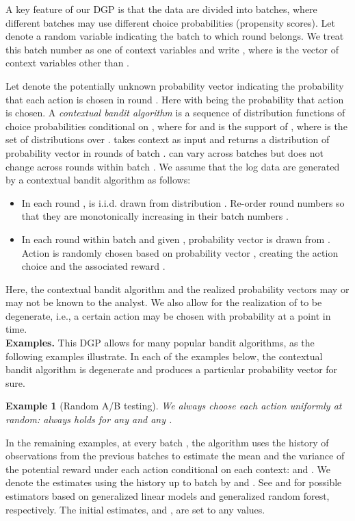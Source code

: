 \documentclass[letterpaper]{article} \usepackage{aaai19}  \usepackage{times}  \usepackage{helvet}  \usepackage{courier}  \usepackage{url}  \usepackage{graphicx}  \frenchspacing  \usepackage{comment}
\newtheorem{example}{Example}
\newcommand{\citet}[1]
{\citeauthor{#1} \shortcite{#1}}
\begin{document}
A key feature of our DGP is that the data  are divided into  batches, where different batches may use different choice probabilities (propensity scores). 
Let  denote a random variable indicating the batch to which round  belongs.
We treat this batch number as one of context variables and write , where  is the vector of context variables other than . 


Let  denote the potentially unknown probability vector indicating the probability that each action is chosen in round . 
Here  with  being the probability that action  is chosen. 
A {\it contextual bandit algorithm} is a sequence  of distribution functions of choice probabilities  conditional on , where  for  and  is the support of , where  is the set of distributions over .
 takes context  as input and returns a distribution of probability vector  in rounds of batch .
 can vary across batches but does not change across rounds within batch . 
We assume that the log data are generated by a contextual bandit algorithm  as follows:

\begin{itemize}
\item In each round ,  is i.i.d. drawn from distribution . 
Re-order round numbers so that they are monotonically increasing in their batch numbers . 
\item In each round  within batch  and given , probability vector  is drawn from . 
Action is randomly chosen based on probability vector , creating the action choice  and the associated reward . 
\end{itemize}

\noindent Here, the contextual bandit algorithm  and the realized probability vectors  may or may not be known to the analyst. 
We also allow for the realization of  to be degenerate, i.e., a certain action may be chosen with probability  at a point in time.\\




\textbf{Examples.} This DGP allows for many popular bandit algorithms, as the following examples illustrate. 
In each of the examples below, the contextual bandit algorithm  is degenerate and produces a particular probability vector  for sure. 

\begin{example}[Random A/B testing]\label{ex:A/B}
	We always choose each action uniformly at random:  always holds for any  and any .
\end{example}

In the remaining examples, at every batch , the algorithm uses the history of observations from the previous  batches to estimate the mean and the variance of the potential reward under each action conditional on each context:  and .
We denote the estimates using the history up to batch  by  and . 
See \citet{Li2012} and \citet{Dimakopoulou2017} for possible estimators based on generalized linear models and generalized random forest, respectively.
The initial estimates,  and , are set to any values. 
\end{document}
